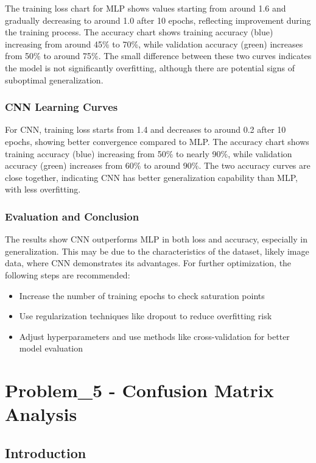 \documentclass[12pt]{article}
\begin{document}
The training loss chart for MLP shows values starting from around 1.6 and gradually 
decreasing to around 1.0 after 10 epochs, reflecting improvement during the training 
process. The accuracy chart shows training accuracy (blue) increasing from around 
45\% to 70\%, while validation accuracy (green) increases from 50\% to around 75\%. 
The small difference between these two curves indicates the model is not 
significantly overfitting, although there are potential signs of suboptimal 
generalization.

\subsubsection{CNN Learning Curves}

For CNN, training loss starts from 1.4 and decreases to around 0.2 after 10 epochs, 
showing better convergence compared to MLP. The accuracy chart shows training 
accuracy (blue) increasing from 50\% to nearly 90\%, while validation accuracy 
(green) increases from 60\% to around 90\%. The two accuracy curves are close 
together, indicating CNN has better generalization capability than MLP, with less 
overfitting.

\subsubsection{Evaluation and Conclusion}

The results show CNN outperforms MLP in both loss and accuracy, especially in 
generalization. This may be due to the characteristics of the dataset, likely image 
data, where CNN demonstrates its advantages. For further optimization, the following 
steps are recommended:

\begin{itemize}
    \item Increase the number of training epochs to check saturation points
    \item Use regularization techniques like dropout to reduce overfitting risk
    \item Adjust hyperparameters and use methods like cross-validation for better 
    model evaluation
\end{itemize}

\section{Problem\_5 - Confusion Matrix Analysis}

\subsection{Introduction}
\end{document}
